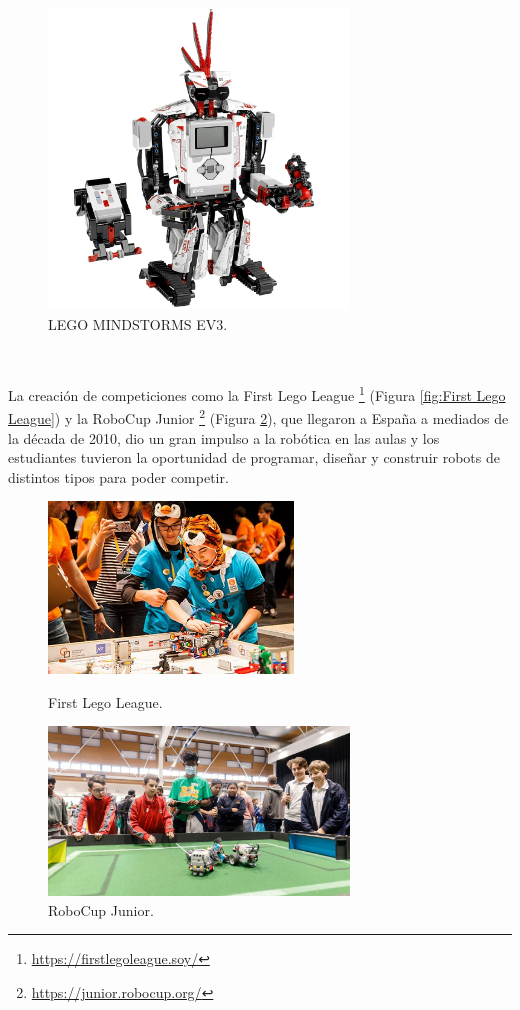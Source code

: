\begin{figure} [h!]
  \begin{center}
    \includegraphics[width=8cm]{figs/lego}
  \end{center}
  \caption{LEGO MINDSTORMS EV3.}
  \label{fig:lego}
\end{figure}\



La creación de competiciones como la First Lego League \footnote{\url{https://firstlegoleague.soy/}} (Figura \ref{fig:First Lego League}) y la RoboCup Junior \footnote{\url{https://junior.robocup.org/}} (Figura \ref{fig:RoboCup Junior}), que llegaron a España a mediados de la década de 2010, dio un gran impulso a la robótica en las aulas y los estudiantes tuvieron la oportunidad de programar, diseñar y construir robots de distintos tipos para poder competir.



\begin{figure}[h!]
  \begin{minipage}{0.48\textwidth}
    \centering
    \includegraphics[width=6.5cm]{figs/first-lego-league.jpg}
    \caption{First Lego League.}
    \label{fig:First Lego League}
  \end{minipage}
  \hfill
  \begin{minipage}{0.48\textwidth}
    \centering
    \includegraphics[width=8cm]{figs/RoboCup_junior.jpg}
    \caption{RoboCup Junior.} 
    \label{fig:RoboCup Junior}
  \end{minipage}
\end{figure}


